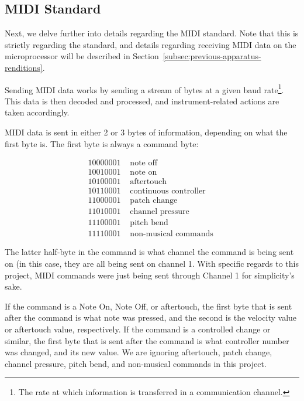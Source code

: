 \subsection{MIDI Standard}\label{subsec:midi-standard-theory}

Next, we delve further into details regarding the MIDI standard.
Note that this is strictly regarding the standard, and details regarding receiving MIDI data on the microprocessor will be described in Section~\ref{subsec:previous-apparatus-renditions}.

Sending MIDI data works by sending a stream of bytes at a given baud rate\footnote{The rate at which information is transferred in a communication channel.}. \cite{phongchit_2016} %
This data is then decoded and processed, and instrument-related actions are taken accordingly. 

MIDI data is sent in either 2 or 3 bytes of information, depending on what the first byte is.
The first byte is always a command byte: \cite{ghassaei_instructables_2017}

\[
\begin{array}{l|l}
10000001 & \text { note off } \\
10010001 & \text { note on } \\
10100001 & \text { aftertouch } \\
10110001 & \text { continuous controller } \\
11000001 & \text { patch change } \\
11010001 & \text { channel pressure } \\
11100001 & \text { pitch bend } \\
11110001 & \text { non-musical commands }
\end{array}
\]

The latter half-byte in the command is what channel the command is being sent on (in this case, they are all being sent on channel 1. 
With specific regards to this project, MIDI commands were just being sent through Channel 1 for simplicity's sake. 

If the command is a Note On, Note Off, or aftertouch, the first byte that is sent after the command is what note was pressed, and the second is the velocity value or aftertouch value, respectively. If the command is a controlled change or similar, the first byte that is sent after the command is what controller number was changed, and its new value. We are ignoring aftertouch, patch change, channel pressure, pitch bend, and non-musical commands in this project. 

